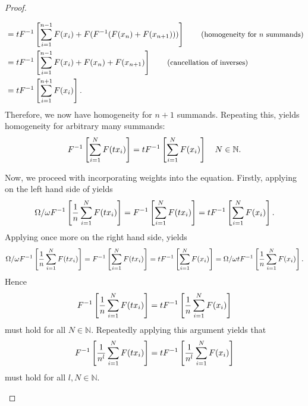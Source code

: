 \begin{proof}
\begin{proofpart}
\begin{proofpp}
\begin{align*}
				                                                 & = t F^{-1} \left[ \sum_{i=1}^{n-1} F(\ta_i) + F ( F^{-1} ( F(\ta_{n}) + F(\ta_{n+1}) )) \right] \tag{\small{homogeneity for $n$ summands}}                            \\
				                                                 & = t F^{-1} \left[ \sum_{i=1}^{n-1} F(\ta_i) + F(\ta_{n}) + F(\ta_{n+1}) \right] \tag{\small{cancellation of inverses}}                                                \\
				                                                 & = t F^{-1} \left[ \sum_{i=1}^{n+1} F(\ta_i) \right].
			\end{align*}
			Therefore, we now have homogeneity for $n+1$ summands. Repeating this, yields homogeneity for arbitrary many summands:
			\begin{equation} \label{proof-homogen-kbig}
				F^{-1} \left[ \sum_{i=1}^{N} F(t x_i) \right] = t F^{-1} \left[ \sum_{i=1}^{N} F(x_i) \right] \quad N \in \mathbb{N}.
			\end{equation}
		\end{proofpp}

		\begin{proofpp}
			Now, we proceed with incorporating weights into the equation. Firstly, applying  on the left hand side of  yields
			\begin{equation*}
				\Omega / \omega F^{-1} \left[ \frac{1}{n} \sum_{i=1}^{N} F(t x_i) \right] = F^{-1} \left[ \sum_{i=1}^{N} F(t x_i) \right] = t F^{-1} \left[ \sum_{i=1}^{N} F(x_i) \right] .
			\end{equation*}
			Applying  once more on the right hand side, yields
			\begin{equation*}
				\Omega / \omega F^{-1} \left[ \frac{1}{n} \sum_{i=1}^{N} F(t x_i) \right] = F^{-1} \left[ \sum_{i=1}^{N} F(t x_i) \right] = t F^{-1} \left[ \sum_{i=1}^{N} F(x_i) \right] =\Omega / \omega t F^{-1} \left[ \frac{1}{n} \sum_{i=1}^{N} F(x_i) \right].
			\end{equation*}
			Hence
			\begin{equation*}
				F^{-1} \left[ \frac{1}{n} \sum_{i=1}^{N} F(t x_i) \right] = t F^{-1} \left[ \frac{1}{n} \sum_{i=1}^{N} F(x_i) \right]
			\end{equation*}
			must hold for all $N \in \mathbb{N}$. Repeatedly applying this argument yields that
			\begin{equation} \label{proof-homogen-prower-weights}
				F^{-1} \left[ \frac{1}{n^l} \sum_{i=1}^{N} F(t x_i) \right] = t F^{-1} \left[ \frac{1}{n^l} \sum_{i=1}^{N} F(x_i) \right]
			\end{equation}
			must hold for all $l, N \in \mathbb{N}$.


\end{proofpp}
\end{proofpart}
\end{proof}
